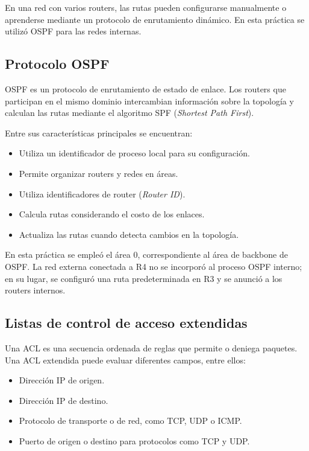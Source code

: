 \documentclass[12pt,a4paper]{article}
\begin{document}
En una red con varios routers, las rutas pueden configurarse
manualmente o aprenderse mediante un protocolo de enrutamiento
dinámico. En esta práctica se utilizó OSPF para las redes internas.

\subsection{Protocolo OSPF}

OSPF es un protocolo de enrutamiento de estado de enlace. Los routers
que participan en el mismo dominio intercambian información sobre
la topología y calculan las rutas mediante el algoritmo SPF
(\textit{Shortest Path First}).

Entre sus características principales se encuentran:

\begin{itemize}
    \item Utiliza un identificador de proceso local para su configuración.
    \item Permite organizar routers y redes en áreas.
    \item Utiliza identificadores de router (\textit{Router ID}).
    \item Calcula rutas considerando el costo de los enlaces.
    \item Actualiza las rutas cuando detecta cambios en la topología.
\end{itemize}

En esta práctica se empleó el área 0, correspondiente al área
de backbone de OSPF. La red externa conectada a R4 no se incorporó
al proceso OSPF interno; en su lugar, se configuró una ruta
predeterminada en R3 y se anunció a los routers internos.

\subsection{Listas de control de acceso extendidas}

Una ACL es una secuencia ordenada de reglas que permite o deniega
paquetes. Una ACL extendida puede evaluar diferentes campos,
entre ellos:

\begin{itemize}
    \item Dirección IP de origen.
    \item Dirección IP de destino.
    \item Protocolo de transporte o de red, como TCP, UDP o ICMP.
    \item Puerto de origen o destino para protocolos como TCP y UDP.
\end{itemize}
\end{document}

